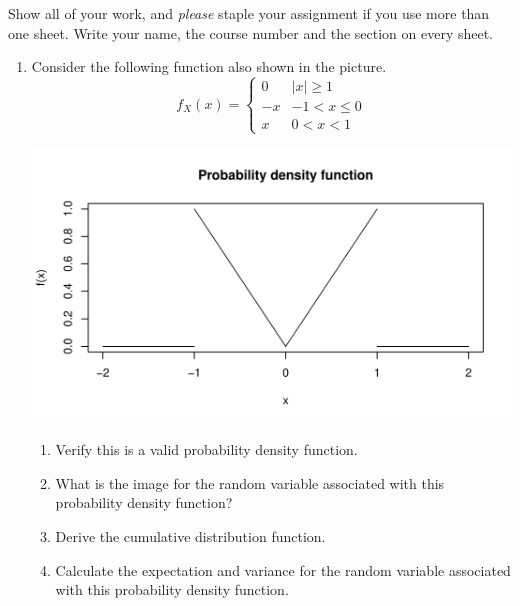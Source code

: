





\pagestyle{fancy} 
Show all of your work, and \emph{please} staple your assignment if you use more than one sheet. Write your name, the course number and the section on every sheet. 

\begin{enumerate} 
 
 
\item Consider the following function also shown in the picture.
\[ f_X(x) = \left\{ \begin{array}{cc} 
0 & |x| \ge 1 \\
-x & -1 < x \le 0 \\
x & 0< x < 1
\end{array} \right. \]

\begin{center}
\includegraphics[scale=0.5]{plot}
\end{center}

\begin{enumerate}
\item Verify this is a valid probability density function.
\item What is the image for the random variable associated with this probability density function?
\item Derive the cumulative distribution function.
\item Calculate the expectation and variance for the random variable associated with this probability density function.
\end{enumerate}


\end{enumerate}
